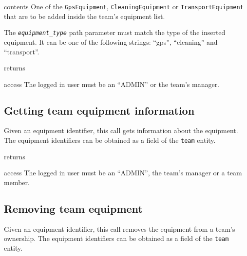 \begin{apidata}{contents}
  One of the \texttt{GpsEquipment}, \texttt{CleaningEquipment} or
  \texttt{TransportEquipment} that are to be added inside the team's equipment
  list.

  The \texttt{\emph{equipment\_type}} path parameter must match the type of the
  inserted equipment. It can be one of the following strings: ``gps'',
  ``cleaning'' and ``transport''.
\end{apidata}
\begin{apidata}{returns}
  \begin{datalist}
  \end{datalist}
\end{apidata}
\begin{apidata}{access}
The logged in user must be an ``ADMIN'' or the team's manager.
\end{apidata}


\subsection{Getting team equipment information}

Given an equipment identifier, this call gets information about the equipment.
The equipment identifiers can be obtained as a field of the \texttt{team}
entity.

\begin{apidata}{returns}
  \begin{datalist}
  \end{datalist}
\end{apidata}
\begin{apidata}{access}
The logged in user must be an ``ADMIN'', the team's manager or a team member.
\end{apidata}


\subsection{Removing team equipment}

Given an equipment identifier, this call removes the equipment from a team's
ownership. The equipment identifiers can be obtained as a field of the
\texttt{team} entity.

